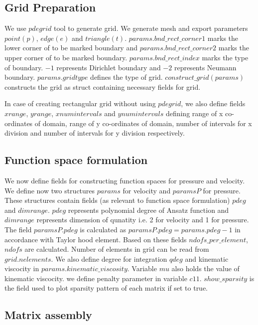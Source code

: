 \documentclass[a4paper,12pt]{book}
\begin{document}
\subsection{Grid Preparation}

We use $pdegrid$ tool to generate grid. We generate mesh and export parameters $point(p)$, $edge(e)$ and $triangle(t)$. $params.bnd\_rect\_corner1$ marks the lower corner of to be marked boundary and $params.bnd\_rect\_corner2$ marks the upper corner of to be marked boundary. $params.bnd\_rect\_index$ marks the type of boundary. $-1$ represents Dirichlet boundary and $-2$ represents Neumann boundary. $params.gridtype$ defines the type of grid. $construct\_grid(params)$ constructs the grid as struct containing necessary fields for grid. 

In case of creating rectangular grid without using $pdegrid$, we also define fields $xrange$, $yrange$, $xnumintervals$ and $ynumintervals$ defining range of x co-ordinates of domain, range of y co-ordinates of domain, number of intervals for x division and number of intervals for y division respectively. 

\subsection{Function space formulation}

We now define fields for constructing function spaces for pressure and velocity. We define now two structures $params$ for velocity and $paramsP$ for pressure. These structures contain fields (as relevant to function space formulation) $pdeg$ and $dimrange$. $pdeg$ represents polynomial degree of Ansatz function and $dimrange$ represents  dimension of qunatity i.e. 2 for velocity and 1 for pressure. The field $paramsP.pdeg$ is calculated as $paramsP.pdeg = params.pdeg - 1$ in accordance with Taylor hood element. Based on these fields $ndofs\_per\_element$, $ndofs$ are calculated. Number of elements in grid can be read from $grid.nelements$. We also define degree for integration $qdeg$ and kinematic viscocity in $params.kinematic\_viscosity$. Variable $mu$ also holds the value of kinematic viscocity. we define penalty parameter in variable $c11$. $show\_sparsity$ is the field used to plot sparsity pattern of each matrix if set to true.\\

\subsection{Matrix assembly}
\end{document}
